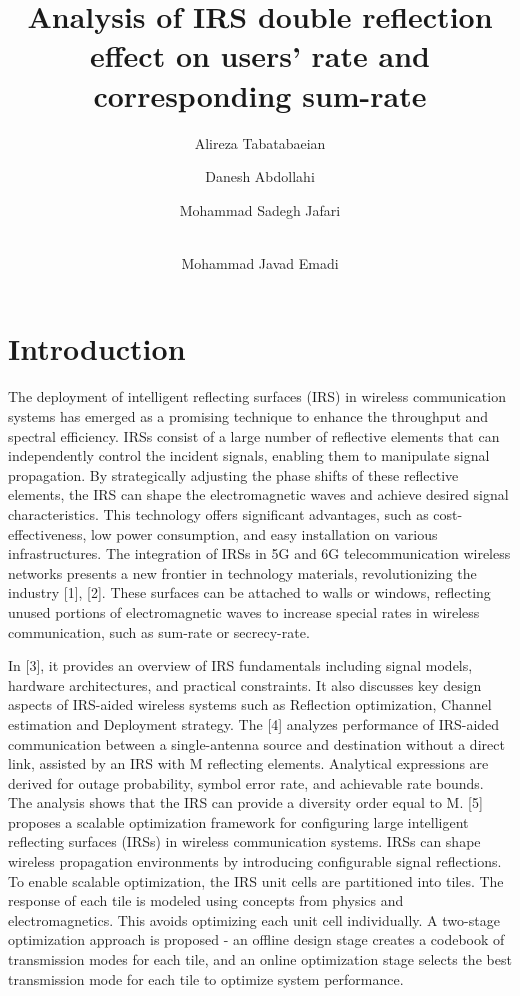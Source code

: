 \documentclass[11pt,twocolumn,twoside]{opticajnl}
\title{Analysis of IRS double reflection effect on users' rate and corresponding sum-rate}
\author[1, *]{Alireza Tabatabaeian}
\author[1]{Danesh Abdollahi}
\author[1]{Mohammad Sadegh Jafari}
\author[1]{\\Mohammad Javad Emadi}
\affil[1]{Department of Electrical Engineering, Amirkabir University of Technology (Tehran Polytechnic), Tehran, Iran}
\affil[*]{alireza2541@aut.ac.ir}
\begin{document}
\maketitle

\section{Introduction}
The deployment of intelligent reflecting surfaces (IRS) in wireless communication systems has emerged as a promising technique to enhance the throughput and spectral efficiency. IRSs consist of a large number of reflective elements that can independently control the incident signals, enabling them to manipulate signal propagation. By strategically adjusting the phase shifts of these reflective elements, the IRS can shape the electromagnetic waves and achieve desired signal characteristics. This technology offers significant advantages, such as cost-effectiveness, low power consumption, and easy installation on various infrastructures. The integration of IRSs in 5G and 6G telecommunication wireless networks presents a new frontier in technology materials, revolutionizing the industry [1], [2]. These surfaces can be attached to walls or windows, reflecting unused portions of electromagnetic waves to increase special rates in wireless communication, such as sum-rate or secrecy-rate.
\par In [3], it provides an overview of IRS fundamentals including signal models, hardware architectures, and practical constraints. It also discusses key design aspects of IRS-aided wireless systems such as Reflection optimization, Channel estimation and Deployment strategy.
The [4] analyzes performance of IRS-aided communication between a single-antenna source and destination without a direct link, assisted by an IRS with M reflecting elements. Analytical expressions are derived for outage probability, symbol error rate, and achievable rate bounds. The analysis shows that the IRS can provide a diversity order equal to M. [5] proposes a scalable optimization framework for configuring large intelligent reflecting surfaces (IRSs) in wireless communication systems. IRSs can shape wireless propagation environments by introducing configurable signal reflections.
To enable scalable optimization, the IRS unit cells are partitioned into tiles. The response of each tile is modeled using concepts from physics and electromagnetics. This avoids optimizing each unit cell individually. A two-stage optimization approach is proposed - an offline design stage creates a codebook of transmission modes for each tile, and an online optimization stage selects the best transmission mode for each tile to optimize system performance.
\end{document}
